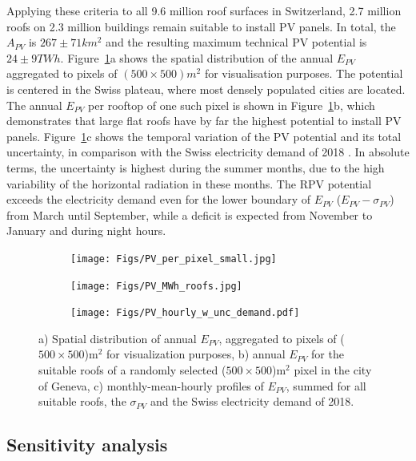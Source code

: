 Applying these criteria to all 9.6 million roof surfaces in Switzerland, 2.7 million roofs on 2.3 million buildings remain suitable to install PV panels. 
In total, the $A_{PV}$ is $267 \pm 71 km^2$ and the resulting maximum technical PV potential is $24 \pm 9 TWh$. Figure~\ref{fig:results}a shows the spatial distribution of the annual $E_{PV}$ aggregated to pixels of $(500 \times 500)m^2$ for visualisation purposes. The potential is centered in the Swiss plateau, where most densely populated cities are located.
%
The annual $E_{PV}$ per rooftop of one such pixel is shown in Figure~\ref{fig:results}b, which demonstrates that large flat roofs have by far the highest potential to install PV panels.
%
Figure~\ref{fig:results}c shows the temporal variation of the PV potential and its total uncertainty, in comparison with the Swiss electricity demand of 2018 \cite{swissgrid_production_2019}. In absolute terms, the uncertainty is highest during the summer months, due to the high variability of the horizontal radiation in these months. The RPV potential exceeds the electricity demand even for the lower boundary of $E_{PV}$ ($E_{PV} - \sigma_{PV}$) from March until September, while a deficit is expected from November to January and during night hours. 

\begin{figure}[t]
\centering
\begin{subfigure}{.63\textwidth}
  \centering
  \texttt{[image: Figs/PV\_per\_pixel\_small.jpg]}
  \subcaption{}
\end{subfigure}
\begin{subfigure}{.34\textwidth}
  \centering
  \texttt{[image: Figs/PV\_MWh\_roofs.jpg]}
  \subcaption{}
\end{subfigure}
\begin{subfigure}{.95\textwidth}
  \centering
  \texttt{[image: Figs/PV\_hourly\_w\_unc\_demand.pdf]} 
  \subcaption{}
\end{subfigure}
\caption{a) Spatial distribution of annual $E_{PV}$, aggregated to pixels of ($500 \times 500$)m$^2$ for visualization purposes, 
b) annual $E_{PV}$ for the suitable roofs of a randomly selected ($500 \times 500$)m$^2$ pixel in the city of Geneva,
c) monthly-mean-hourly profiles of $E_{PV}$, summed for all suitable roofs, the $\sigma_{PV}$ and the Swiss electricity demand of 2018.}
\label{fig:results}
\end{figure}

\subsection{Sensitivity analysis}

